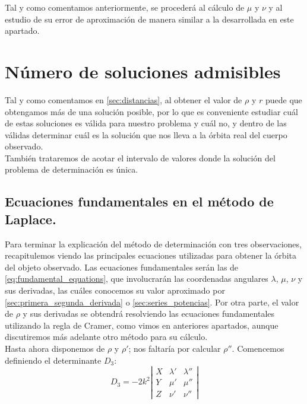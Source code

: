 \documentclass[11pt]{book}
\begin{document}
Tal y como comentamos anteriormente, se procederá al cálculo de $\mu$ y $\nu$ y al estudio de su error de aproximación de manera similar a la desarrollada en este apartado.\\

\newpage
\thispagestyle{empty}








\chapter{Número de soluciones admisibles}
\label{chap:soluciones_admisibles}
Tal y como comentamos en \ref{sec:distancias}, al obtener el valor de $\rho$ y $r$ puede que obtengamos más de una solución posible, por lo que es conveniente estudiar cuál de estas soluciones es válida para nuestro problema y cuál no, y dentro de las válidas determinar cuál es la solución que nos lleva a la órbita real del cuerpo observado.\\

También trataremos de acotar el intervalo de valores donde la solución del problema de determinación es única.\\

\section{Ecuaciones fundamentales en el método de Laplace.}
\label{sec:fundamental_equations}
Para terminar la explicación del método de determinación con tres observaciones, recapitulemos viendo las principales ecuaciones utilizadas para obtener la órbita del objeto observado. Las ecuaciones fundamentales serán las de \eqref{eq:fundamental_equations}, que involucrarán las coordenadas angulares $\lambda$, $\mu$, $\nu$ y sus derivadas, las cuáles conocemos su valor aproximado por \ref{sec:primera_segunda_derivada} o \ref{sec:series_potencias}. Por otra parte, el valor de $\rho$ y sus derivadas se obtendrá resolviendo las ecuaciones fundamentales utilizando la regla de Cramer, como vimos en anteriores apartados, aunque discutiremos más adelante otro método para su cálculo.\\

Hasta ahora disponemos de $\rho$ y $\rho'$; nos faltaría por calcular $\rho''$. Comencemos definiendo el determinante $D_3$:
\[
D_3=-2k^2
\left|
\begin{array}{ccc}
X & \lambda' & \lambda''\\
Y & \mu' & \mu''\\
Z & \nu' & \nu''
\end{array}
\right|
\]
\end{document}
